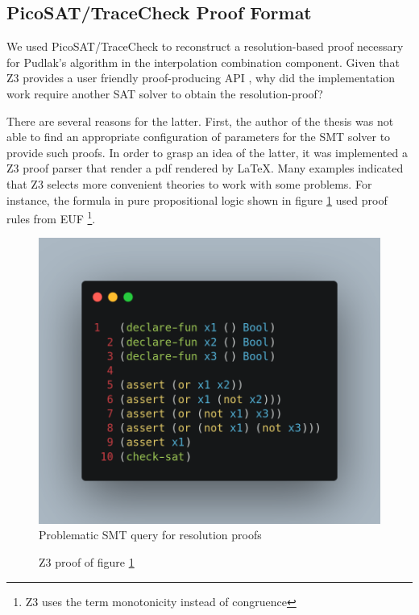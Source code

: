 \subsection{PicoSAT/TraceCheck Proof Format}

We used PicoSAT/TraceCheck to reconstruct a resolution-based proof 
necessary for Pudlak's algorithm in the interpolation combination 
component. Given that Z3 provides a user friendly proof-producing 
API \cite{Moura_proofsand}, why did the implementation
work require another SAT solver to obtain the resolution-proof?

There are several reasons for the latter. First, the author of the
thesis was not able to find an appropriate configuration of parameters
for the SMT solver to provide such proofs. In order to grasp an idea
of the latter, it was implemented a Z3 proof parser that render
a pdf rendered by \LaTeX. Many examples indicated that
Z3 selects more convenient theories to work with some problems. For
instance, the formula in pure propositional logic shown in figure 
\ref{query_proof_problem} used proof rules from EUF \footnote{Z3 uses
the term monotonicity instead of congruence}.

\begin{figure}
  \centering
  \includegraphics[scale=0.2]{figures/query_screenshot}
  \caption{Problematic SMT query for resolution proofs} \label{query_proof_problem}
\end{figure}


%
\begin{figure}
  
  \caption{Z3 proof of figure \ref{query_proof_problem}} \label{smt_proof_problem}
\end{figure}


